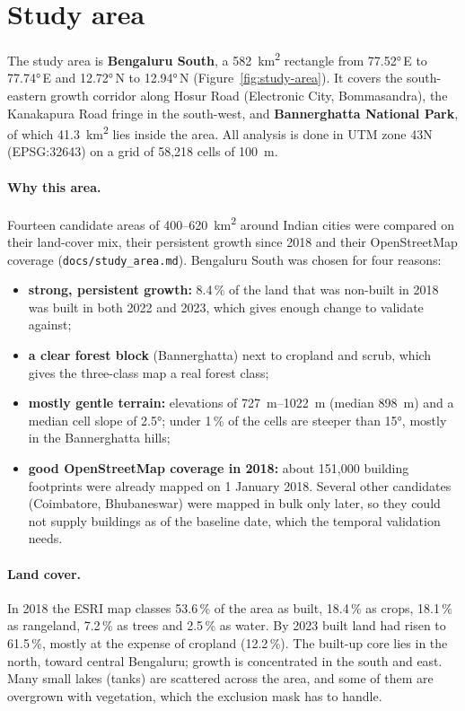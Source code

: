 \section{Study area}\label{sec:study-area}

The study area is \textbf{Bengaluru South}, a \SI{582}{\km\squared} rectangle from
\ang{77.52}\,E to \ang{77.74}\,E and \ang{12.72}\,N to \ang{12.94}\,N
(Figure~\ref{fig:study-area}). It covers the south-eastern growth corridor along Hosur Road
(Electronic City, Bommasandra), the Kanakapura Road fringe in the south-west, and
\textbf{Bannerghatta National Park}, of which \SI{41.3}{\km\squared} lies inside the area. All
analysis is done in UTM zone 43N (EPSG:32643) on a grid of 58{,}218 cells of
\SI{100}{\m}.

\paragraph{Why this area.} Fourteen candidate areas of 400--\SI{620}{\km\squared} around Indian
cities were compared on their land-cover mix, their persistent growth since 2018 and their
OpenStreetMap coverage (\texttt{docs/study\_area.md}). Bengaluru South was chosen for four
reasons:
\begin{itemize}
  \item \textbf{strong, persistent growth:} 8.4\,\% of the land that was non-built in 2018 was
        built in both 2022 and 2023, which gives enough change to validate against;
  \item \textbf{a clear forest block} (Bannerghatta) next to cropland and scrub, which gives the
        three-class map a real forest class;
  \item \textbf{mostly gentle terrain:} elevations of \SIrange{727}{1022}{\m} (median
        \SI{898}{\m}) and a median cell slope of \ang{2.5}; under 1\,\% of the cells are
        steeper than \ang{15}, mostly in the Bannerghatta hills;
  \item \textbf{good OpenStreetMap coverage in 2018:} about 151{,}000 building footprints
        were already mapped on 1 January 2018. Several other candidates (Coimbatore,
        Bhubaneswar) were mapped in bulk only later, so they could not supply buildings as of
        the baseline date, which the temporal validation needs.
\end{itemize}

\paragraph{Land cover.} In 2018 the ESRI map classes 53.6\,\% of the area as built, 18.4\,\% as
crops, 18.1\,\% as rangeland, 7.2\,\% as trees and 2.5\,\% as water. By 2023 built land had
risen to 61.5\,\%, mostly at the expense of cropland (12.2\,\%). The built-up core lies in the
north, toward central Bengaluru; growth is concentrated in the south and east. Many small lakes
(tanks) are scattered across the area, and some of them are overgrown with vegetation, which the
exclusion mask has to handle.

